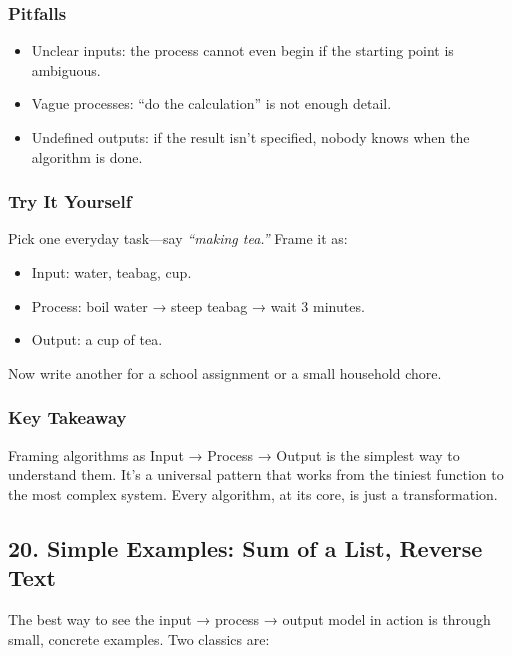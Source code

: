 \documentclass[
  letterpaper,
  DIV=11,
  numbers=noendperiod]{scrreprt}
\providecommand{\tightlist}{%
  \setlength{\itemsep}{0pt}\setlength{\parskip}{0pt}}
\begin{document}
\subsubsection{Pitfalls}\label{pitfalls-15}

\begin{itemize}
\tightlist
\item
  Unclear inputs: the process cannot even begin if the starting point is
  ambiguous.
\item
  Vague processes: ``do the calculation'' is not enough detail.
\item
  Undefined outputs: if the result isn't specified, nobody knows when
  the algorithm is done.
\end{itemize}

\subsubsection{Try It Yourself}\label{try-it-yourself-18}

Pick one everyday task---say \emph{``making tea.''} Frame it as:

\begin{itemize}
\tightlist
\item
  Input: water, teabag, cup.
\item
  Process: boil water → steep teabag → wait 3 minutes.
\item
  Output: a cup of tea.
\end{itemize}

Now write another for a school assignment or a small household chore.

\subsubsection{Key Takeaway}\label{key-takeaway-17}

Framing algorithms as Input → Process → Output is the simplest way to
understand them. It's a universal pattern that works from the tiniest
function to the most complex system. Every algorithm, at its core, is
just a transformation.

\subsection{20. Simple Examples: Sum of a List, Reverse
Text}\label{simple-examples-sum-of-a-list-reverse-text}

The best way to see the input → process → output model in action is
through small, concrete examples. Two classics are:
\end{document}
